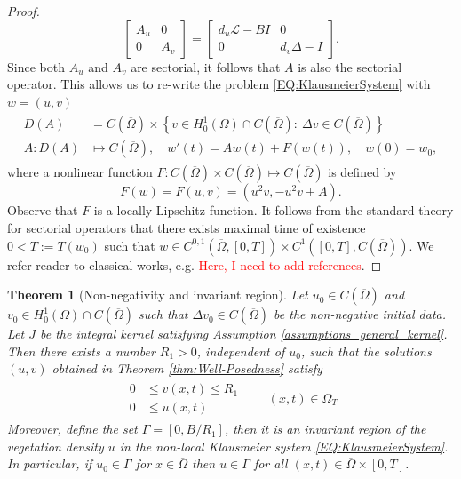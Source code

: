 \documentclass[12pt, a4paper]{article}
\theoremstyle{break}
\newtheorem{thm}{Theorem}[section]
\theoremstyle{break}
\theoremstyle{break}
\theoremstyle{break}
\theoremstyle{break}
\theoremstyle{break}
\theoremstyle{break}
\begin{document}
\begin{proof}
\begin{equation}
\begin{bmatrix}
            A_u & 0\\ 0 & A_v
        \end{bmatrix}
        =
        \begin{bmatrix}
            d_u \mathcal{L} - B I & 0 \\ 0 & d_v \Delta - I
        \end{bmatrix}.
    \end{equation}
    Since both $A_u$ and $A_v$ are sectorial, it follows that $A$ is also the sectorial operator. This allows us to re-write the problem \eqref{EQ:KlausmeierSystem} with $w = (u, v)$
    \begin{align}
        \label{EQ:SemigroupFormulation}
        \begin{split}
        D(A) &= C(\overline{\Omega}) \times \left\{ v \in H^1_0(\Omega) \cap C(\overline{\Omega}):\: \Delta v \in C(\overline{\Omega}) \right\} \\
        A: D(A) &\mapsto C(\overline{\Omega}), \quad w'(t) = A w(t) + F(w(t)), \quad w(0) = w_0,
        \end{split}
    \end{align}
    where a nonlinear function $F: C(\overline{\Omega}) \times C(\overline{\Omega}) \mapsto C(\overline{\Omega}) $ is defined by
    \begin{equation}
        F(w) = F(u, v) = (u^2 v, -u^2 v + A).
    \end{equation}
    Observe that $F$ is a locally Lipschitz function. It follows from the standard theory for sectorial operators that there exists maximal time of existence $0 < T := T(w_0)$ such that $w \in C^{0,1}\left(\overline{\Omega}, [0, T]\right) \times C^1\left( [0, T], C(\overline{\Omega}) \right)$. We refer reader to classical works, e.g. \textcolor{red}{Here, I need to add references}. 
\end{proof}
\begin{thm}[Non-negativity and invariant region]
    \label{thm:Non-negativity}
     Let $u_0 \in C(\overline{\Omega})$ and $v_0 \in H^1_0(\Omega)\cap C(\overline{\Omega})$ such that $\Delta v_0 \in C(\overline{\Omega})$ be the non-negative initial data. Let $J$ be the integral kernel satisfying Assumption \ref{assumptions_general_kernel}. Then there exists a number $R_1 > 0$, independent of $u_0$, such that the solutions $(u, v)$ obtained in Theorem \ref{thm:Well-Posedness} satisfy
     \begin{align*}
        \begin{split}
             0 &\leq v(x, t) \leq R_1 \\
             0 &\leq u(x, t)
        \end{split}
        \quad\quad (x, t) \in \Omega_T
     \end{align*}
     Moreover, define the set $\Gamma = [0, B/R_1]$, then it is an invariant region of the  vegetation density $u$ in the non-local Klausmeier system \eqref{EQ:KlausmeierSystem}. In particular, if $u_0 \in \Gamma$ for $x \in \overline{\Omega}$ then $u \in \Gamma$ for all $(x, t) \in \overline{\Omega} \times [0, T]$.
\end{thm}
\end{document}
